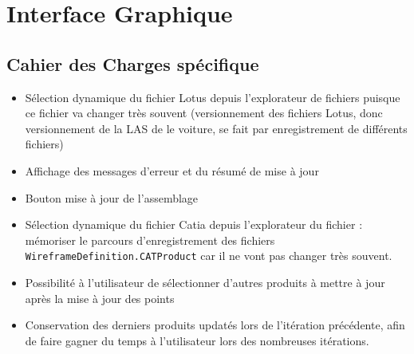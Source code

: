 \section{Interface Graphique}
\label{interf_graph}
\subsection{Cahier des Charges spécifique} %
\begin{itemize}
    \item Sélection dynamique du fichier Lotus depuis l'explorateur de fichiers puisque ce fichier va changer très souvent (versionnement des fichiers Lotus, donc versionnement de la LAS de le voiture, se fait par enregistrement de différents fichiers) 
    \item Affichage des messages d'erreur et du résumé de mise à jour
    \item Bouton mise à jour de l'assemblage
    \item Sélection dynamique du fichier Catia depuis l'explorateur du fichier : mémoriser le parcours d'enregistrement des fichiers \texttt{WireframeDefinition.CATProduct} car il ne vont pas changer très souvent.
    \item Possibilité à l'utilisateur de sélectionner d'autres produits à mettre à jour après la mise à jour des points
    \item Conservation des derniers produits updatés lors de l'itération précédente, afin de faire gagner du temps à l'utilisateur lors des nombreuses itérations.
\end{itemize}


